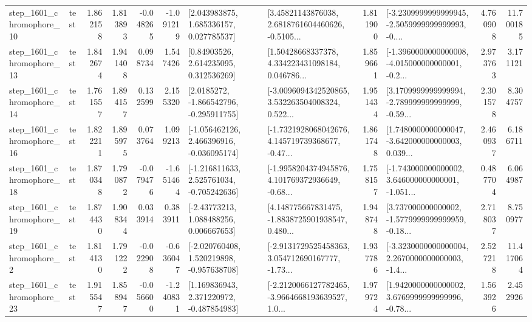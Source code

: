 \begin{tabular}{llrrrrllrlrr}
 step\_1601\_chromophore\_10 &      test &      1.862158 &    1.813893 &     -0.048265 & -1.091219 &     [2.043983875, 1.685336157, 0.027785537] &  [3.45821143876038, 2.6818761604460626, -0.5105... &       1.811900 &  [-3.2309999999999945, -2.5059999999999993, -0.... &            4.760908 &         11.700185 \\
 step\_1601\_chromophore\_13 &      test &      1.842674 &    1.941408 &      0.098734 &  1.547426 &      [0.84903526, 2.614235095, 0.312536269] &  [1.50428668337378, 4.334223431098184, 0.046786... &       1.859661 &  [-1.3960000000000008, -4.015000000000001, -0.2... &            2.973763 &          3.171121 \\
 step\_1601\_chromophore\_14 &      test &      1.761557 &    1.894157 &      0.132599 &  2.155320 &     [2.0185272, -1.866542796, -0.295911755] &  [-3.0096094342520865, 3.532263504008324, 0.522... &       1.951434 &  [3.1709999999999994, -2.789999999999999, -0.59... &            2.301578 &          8.304757 \\
 step\_1601\_chromophore\_16 &      test &      1.822211 &    1.895975 &      0.073764 &  1.099213 &   [-1.056462126, 2.466396916, -0.036095174] &  [-1.7321928068042676, 4.145719739368677, -0.47... &       1.861748 &  [1.7480000000000047, -3.642000000000003, 0.039... &            2.460937 &          6.186711 \\
 step\_1601\_chromophore\_18 &      test &      1.870348 &    1.790872 &     -0.079476 & -1.651464 &   [-1.216811633, 2.525761034, -0.705242636] &  [-1.9958204374945876, 4.101769372936649, -0.68... &       1.758157 &  [-1.743000000000002, 3.646000000000001, -1.051... &            0.487704 &          6.064987 \\
 step\_1601\_chromophore\_19 &      test &      1.874430 &    1.908344 &      0.033914 &  0.383911 &     [-2.43773213, 1.088488256, 0.006667653] &  [4.148775667831475, -1.8838725901938547, 0.480... &       1.948748 &  [3.737000000000002, -1.5779999999999959, -0.18... &            2.718037 &          8.750977 \\
  step\_1601\_chromophore\_2 &      test &      1.814130 &    1.791222 &     -0.022908 & -0.636047 &   [-2.020760408, 1.520219898, -0.957638708] &  [-2.9131729525458363, 3.054712690167777, -1.73... &       1.937786 &  [-3.3230000000000004, 2.2670000000000003, -1.4... &            2.527218 &         11.417064 \\
 step\_1601\_chromophore\_23 &      test &      1.915547 &    1.858947 &     -0.056600 & -1.240831 &    [1.169836943, 2.371220972, -0.487854983] &  [-2.2120066127782465, -3.9664668193639527, 1.0... &       1.979724 &  [1.9420000000000002, 3.6769999999999996, -0.78... &            1.563926 &          2.452926 \\

\end{tabular}
